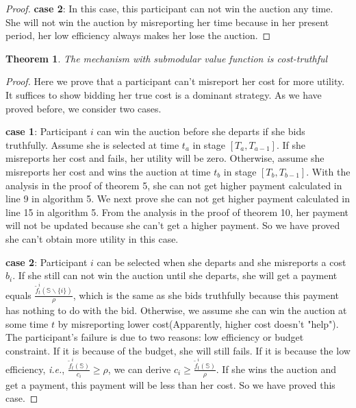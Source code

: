 \documentclass[conference,compsocconf,letterpaper,10pt]{IEEEtran}
\newtheorem{theorem}{Theorem}
\newcommand{\ie}{{\em i.e.}}
\begin{document}
\begin{proof}
\textbf{case 2}: In this case, this participant can not win the auction any time. She will not win the auction by misreporting her time because in her present period, her low efficiency always makes her lose the auction.
\end{proof}

\begin{theorem}
The mechanism with submodular value function is cost-truthful
\end{theorem}
\begin{proof}
Here we prove that a participant can't misreport her cost for more utility. It suffices to show bidding her true cost is a dominant strategy. As we have proved before, we consider two cases.

\textbf{case 1}: Participant $i$ can win the auction before she departs if she bids truthfully. Assume she is selected at time $t_a$ in stage $[T_a, T_{a-1}]$. If she misreports her cost and fails, her utility will be zero. Otherwise, assume she misreports her cost and wins the auction at time $t_b$ in stage $[T_b,T_{b-1}]$. With the analysis in the proof of theorem 5, she can not get higher payment calculated in line 9 in algorithm 5. We next prove she can not get higher payment calculated in line 15 in algorithm 5. From the analysis in the proof of theorem 10, her payment will not be updated because she can't get a higher payment. So we have proved she can't obtain more utility in this case.

\textbf{case 2}: Participant $i$ can be selected when she departs and she misreports a cost $b_i$. If she still can not win the auction until she departs, she will get a payment equals $\frac{\tilde{f}^i_t(\mathbb{S}\backslash\{i\})}{\rho}$, which is the same as she bids truthfully because this payment has nothing to do with the bid. Otherwise, we assume she can win the auction at some time $t$ by misreporting lower cost(Apparently, higher cost doesn't "help"). The participant's failure is due to two reasons: low efficiency or budget constraint. If it is because of the budget, she will still fails. If it is because the low efficiency, \ie, $\frac{\tilde{f}^i_t(\mathbb{S})}{c_i}\ge\rho$, we can derive $c_i \ge \frac{\tilde{f}^i_t(\mathbb{S})}{\rho}$. If she wins the auction and get a payment, this payment will be less than her cost. So we have proved this case.


\end{proof}
\end{document}
